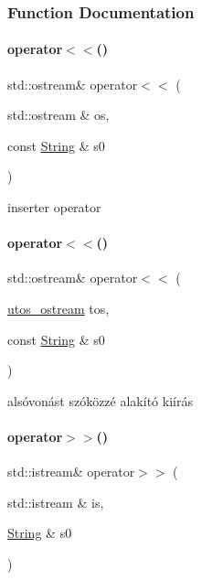 \subsubsection{Function Documentation}
\mbox{\label{schtring_8cpp_aef14876e55f43fb4ffa7b91664467ecb}} 
\paragraph{\texorpdfstring{operator$<$$<$()}{operator<<()}\hspace{0.1cm}{\footnotesize\ttfamily [1/2]}}
{\footnotesize\ttfamily std\+::ostream\& operator$<$$<$ (\begin{DoxyParamCaption}\item[{std\+::ostream \&}]{os,  }\item[{const \mbox{\hyperlink{class_string}{String}} \&}]{s0 }\end{DoxyParamCaption})}



inserter operator 

\mbox{\label{schtring_8cpp_a06c0f45780d45c035c1eabecbb34198d}} 
\paragraph{\texorpdfstring{operator$<$$<$()}{operator<<()}\hspace{0.1cm}{\footnotesize\ttfamily [2/2]}}
{\footnotesize\ttfamily std\+::ostream\& operator$<$$<$ (\begin{DoxyParamCaption}\item[{\mbox{\hyperlink{structutos__ostream}{utos\+\_\+ostream}}}]{tos,  }\item[{const \mbox{\hyperlink{class_string}{String}} \&}]{s0 }\end{DoxyParamCaption})}



alsóvonást szóközzé alakító kiírás 

\mbox{\label{schtring_8cpp_aea8ed420ad5e70828bc42b0fb9b49366}} 
\paragraph{\texorpdfstring{operator$>$$>$()}{operator>>()}}
{\footnotesize\ttfamily std\+::istream\& operator$>$$>$ (\begin{DoxyParamCaption}\item[{std\+::istream \&}]{is,  }\item[{\mbox{\hyperlink{class_string}{String}} \&}]{s0 }\end{DoxyParamCaption})}



